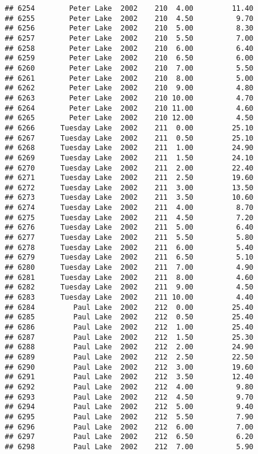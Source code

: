 \documentclass[
]{article}
\begin{document}
\begin{verbatim}
## 6254        Peter Lake  2002    210  4.00         11.40
## 6255        Peter Lake  2002    210  4.50          9.70
## 6256        Peter Lake  2002    210  5.00          8.30
## 6257        Peter Lake  2002    210  5.50          7.00
## 6258        Peter Lake  2002    210  6.00          6.40
## 6259        Peter Lake  2002    210  6.50          6.00
## 6260        Peter Lake  2002    210  7.00          5.50
## 6261        Peter Lake  2002    210  8.00          5.00
## 6262        Peter Lake  2002    210  9.00          4.80
## 6263        Peter Lake  2002    210 10.00          4.70
## 6264        Peter Lake  2002    210 11.00          4.60
## 6265        Peter Lake  2002    210 12.00          4.50
## 6266      Tuesday Lake  2002    211  0.00         25.10
## 6267      Tuesday Lake  2002    211  0.50         25.10
## 6268      Tuesday Lake  2002    211  1.00         24.90
## 6269      Tuesday Lake  2002    211  1.50         24.10
## 6270      Tuesday Lake  2002    211  2.00         22.40
## 6271      Tuesday Lake  2002    211  2.50         19.60
## 6272      Tuesday Lake  2002    211  3.00         13.50
## 6273      Tuesday Lake  2002    211  3.50         10.60
## 6274      Tuesday Lake  2002    211  4.00          8.70
## 6275      Tuesday Lake  2002    211  4.50          7.20
## 6276      Tuesday Lake  2002    211  5.00          6.40
## 6277      Tuesday Lake  2002    211  5.50          5.80
## 6278      Tuesday Lake  2002    211  6.00          5.40
## 6279      Tuesday Lake  2002    211  6.50          5.10
## 6280      Tuesday Lake  2002    211  7.00          4.90
## 6281      Tuesday Lake  2002    211  8.00          4.60
## 6282      Tuesday Lake  2002    211  9.00          4.50
## 6283      Tuesday Lake  2002    211 10.00          4.40
## 6284         Paul Lake  2002    212  0.00         25.40
## 6285         Paul Lake  2002    212  0.50         25.40
## 6286         Paul Lake  2002    212  1.00         25.40
## 6287         Paul Lake  2002    212  1.50         25.30
## 6288         Paul Lake  2002    212  2.00         24.90
## 6289         Paul Lake  2002    212  2.50         22.50
## 6290         Paul Lake  2002    212  3.00         19.60
## 6291         Paul Lake  2002    212  3.50         12.40
## 6292         Paul Lake  2002    212  4.00          9.80
## 6293         Paul Lake  2002    212  4.50          9.70
## 6294         Paul Lake  2002    212  5.00          9.40
## 6295         Paul Lake  2002    212  5.50          7.90
## 6296         Paul Lake  2002    212  6.00          7.00
## 6297         Paul Lake  2002    212  6.50          6.20
## 6298         Paul Lake  2002    212  7.00          5.90

\end{verbatim}
\end{document}
